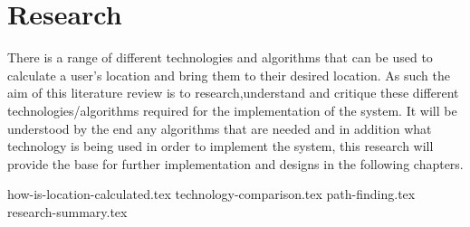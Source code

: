 \section{Research}
There is a range of different technologies and algorithms that can be used to calculate a user’s location and bring them to their desired location. As such the aim of this literature review is to research,understand and critique these different technologies/algorithms required for the implementation of the system. It will be understood by the end any algorithms that are needed and in addition what technology is being used in order to implement the system, this research will provide the base for further implementation and designs in the following chapters.
		
{how-is-location-calculated.tex}
{technology-comparison.tex}
{path-finding.tex}
{research-summary.tex}
		